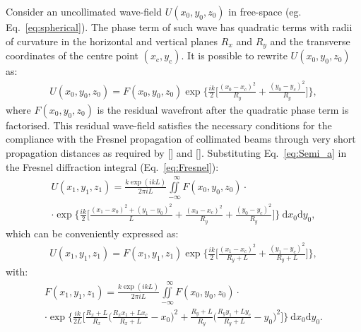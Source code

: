 \begin{refsection}
Consider an uncollimated wave-field $U(x_0,y_0,z_0)$ in free-space (eg. Eq.~\ref{eq:spherical}). The phase term of such wave has quadratic terms with radii of curvature in the horizontal and vertical planes $R_x$ and $R_y$ and the transverse coordinates of the centre point $(x_\text{c},y_\text{c})$. It is possible to rewrite $U(x_0,y_0,z_0)$ as:
\begin{align}\label{eq:Semi_a}
    U(x_0,y_0,z_0) = F(x_0,y_0,z_0)\exp{\Bigg\{\frac{ik}{2}\Bigg[\frac{(x_0-x_c)^2}{R_y}+\frac{(y_0-y_c)^2}{R_y} \Bigg]\Bigg\}},
\end{align}{}
where $F(x_0,y_0,z_0)$ is the residual wavefront after the quadratic phase term is factorised. This residual wave-field satisfies the necessary conditions for the compliance with the Fresnel propagation of collimated beams through very short propagation distances as required by [\cite{Southwell1981}] and [\cite{Rees87}]. Substituting Eq.~\ref{eq:Semi_a} in the Fresnel diffraction integral (Eq.~\ref{eq:Fresnel}):
\begin{multline}\label{eq:Semi_b}
    U(x_1,y_1,z_1)=\frac{k\exp{(ikL)}}{2\pi i L}\iint\limits_{-\infty}^{\hspace{8pt}\infty}{F(x_0,y_0,z_0)}\cdot\\ \cdot{\exp{\Bigg\{\frac{ik}{2}\Bigg[\frac{(x_1-x_0)^2+(y_1-y_0)^2}{L}+\frac{(x_0-x_c)^2}{R_y}+\frac{(y_0-y_c)^2}{R_y} \Bigg]\Bigg\}}~\mathrm{d}x_0\mathrm{d}y_0},
\end{multline}
which can be conveniently expressed as: 
\begin{align}\label{eq:Semi_c1}
    U(x_1,y_1,z_1) = F(x_1,y_1,z_1)\exp{\Bigg\{\frac{ik}{2}\Bigg[\frac{(x_1-x_c)^2}{R_y+L}+\frac{(y_1-y_c)^2}{R_y+L} \Bigg]\Bigg\}},
\end{align}{}
with:
\begin{multline}\label{eq:Semi_c2}
    F(x_1,y_1,z_1)=\frac{k\exp{(ikL)}}{2\pi i L}\iint\limits_{-\infty}^{\hspace{8pt}\infty}{F(x_0,y_0,z_0)}\cdot\\ \cdot{\exp{\Bigg\{\frac{ik}{2L}\Bigg[\frac{R_x + L}{R_x}\Bigg(\frac{R_xx_1+Lx_c}{R_x+L} - x_0\Bigg)^2+\frac{R_y + L}{R_y}\Bigg(\frac{R_yy_1+Ly_c}{R_y+L} - y_0\Bigg)^2\Bigg]\Bigg\}}~\mathrm{d}x_0\mathrm{d}y_0}.
\end{multline}

\end{refsection}
